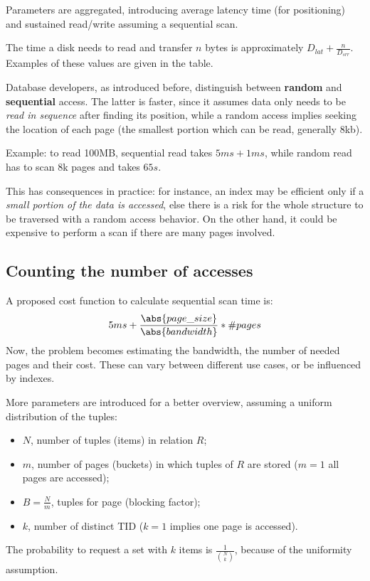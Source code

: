 Parameters are aggregated, introducing average latency time (for positioning) and sustained read/write assuming a sequential scan. 

The time a disk needs to read and transfer $n$ bytes is approximately $D_{lat} + \frac{n}{D_{srr}}$. Examples of these values are given in the table.

Database developers, as introduced before, distinguish between \textbf{random} and \textbf{sequential} access. The latter is faster, since it assumes data only needs to be \textit{read in sequence} after finding its position, while a random access implies seeking the location of each page (the smallest portion which can be read, generally 8kb).

Example: to read 100MB, sequential read takes $5ms + 1ms$, while random read has to scan 8k pages and takes $65s$.

This has consequences in practice: for instance, an index may be efficient only if a \textit{small portion of the data is accessed}, else there is a risk for the whole structure to be traversed with a random access behavior. On the other hand, it could be expensive to perform a scan if there are many pages involved. 

\subsection{Counting the number of accesses}
A proposed cost function to calculate sequential scan time is: 
$$5ms + \frac{\abs{page\_size}}{\abs{bandwidth}} * \#pages$$
Now, the problem becomes estimating the bandwidth, the number of needed pages and their cost. These can vary between different use cases, or be influenced by indexes. 

More parameters are introduced for a better overview, assuming a uniform distribution of the tuples:
\begin{itemize}
	\item $N$, number of tuples (items) in relation $R$;
	\item $m$, number of pages (buckets) in which tuples of $R$ are stored ($m = 1$ all pages are accessed);
	\item $B = \frac{N}{m}$, tuples for page (blocking factor);
	\item $k$, number of distinct TID ($k = 1$ implies one page is accessed).
\end{itemize}
The probability to request a set with $k$ items is $\frac{1}{{{N}\choose{k}}}$, because of the uniformity assumption.

